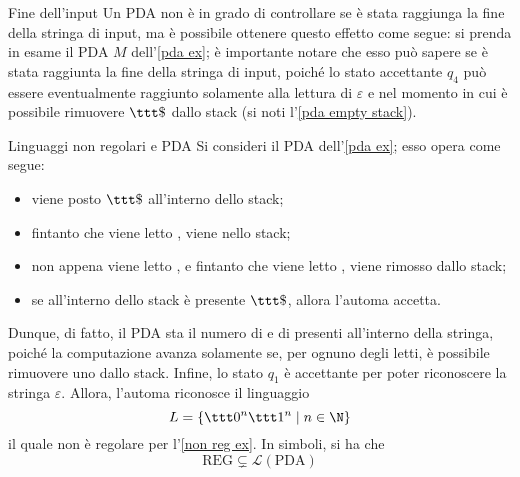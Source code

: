 \documentclass[a4paper, 12pt]{report}
\begin{document}
    \begin{framedobs}{Fine dell'input}
        Un PDA non è in grado di controllare se è stata raggiunga la fine della stringa di input, ma è possibile ottenere questo effetto come segue: si prenda in esame il PDA $M$ dell'\cref{pda ex}; è importante notare che esso può sapere se è stata raggiunta la fine della stringa di input, poiché lo stato accettante $q_4$ può essere eventualmente raggiunto solamente alla lettura di $\varepsilon$ e nel momento in cui è possibile rimuovere $\ttt \$$ dallo stack (si noti l'\cref{pda empty stack}).
    \end{framedobs}

    \begin{framedobs}{Linguaggi non regolari e PDA}
        Si consideri il PDA dell'\cref{pda ex}; esso opera come segue:

        \begin{itemize}
            \item viene posto $\ttt \$$ all'interno dello stack;
            \item fintanto che viene letto , viene   nello stack;
            \item non appena viene letto , e fintanto che viene letto , viene rimosso  dallo stack;
            \item se all'interno dello stack è presente $\ttt \$$, allora l'automa accetta.
        \end{itemize}

        Dunque, di fatto, il PDA sta  il numero di  e di  presenti all'interno della stringa, poiché la computazione avanza solamente se, per ognuno degli  letti, è possibile rimuovere uno  dallo stack. Infine, lo stato $q_1$ è accettante per poter riconoscere la stringa $\varepsilon$. Allora, l'automa riconosce il linguaggio $$L = \{\ttt 0 ^n \ttt 1 ^n \mid n \in \N\}$$ il quale non è regolare per l'\cref{non reg ex}. In simboli, si ha che $$\mathrm{REG} \subsetneq \mathcal{L}(\mathrm{PDA})$$
    \end{framedobs}
\end{document}
